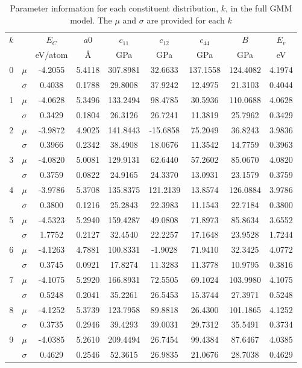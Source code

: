 \begin{table}[ht]
	\centering
	\caption{Parameter information for each constituent distribution, $k$, in the full GMM model.  The $\mu$ and $\sigma$ are provided for each $k$}
  \label{tbl:sw_all_gmm_qois}
  \begin{tabular}{ccccccccc}
    \hline
    $k$ & & $E_C$ & $a0$ & $c_{11}$ & $c_{12}$ & $c_{44}$ & $B$ & $E_v$\\
        & & eV/atom & \AA & GPa & GPa & GPa & GPa & eV \\
    \hline
    0 & $\mu$     & -4.2055 & 5.4118 & 307.8981 & 32.6633 & 137.1558 & 124.4082 & 4.1974\\
     & $\sigma$   & 0.4038 & 0.1788 & 29.8008 & 37.9242 & 12.4975 & 21.3103 & 0.4044\\
    1 & $\mu$     & -4.0628 & 5.3496 & 133.2494 & 98.4785 & 30.5936 & 110.0688 & 4.0628\\
     & $\sigma$   & 0.3429 & 0.1804 & 26.3126 & 26.7241 & 11.3819 & 25.7962 & 0.3429\\
    2 & $\mu$     & -3.9872 & 4.9025 & 141.8443 & -15.6858 & 75.2049 & 36.8243 & 3.9836\\
     & $\sigma$   & 0.3966 & 0.2342 & 38.4908 & 18.0676 & 11.3542 & 14.7759 & 0.3963\\
    3 & $\mu$     & -4.0820 & 5.0081 & 129.9131 & 62.6440 & 57.2602 & 85.0670 & 4.0820\\
     & $\sigma$   & 0.3759 & 0.0822 & 24.9165 & 24.3370 & 13.0931 & 23.1579 & 0.3759\\
    4 & $\mu$     & -3.9786 & 5.3708 & 135.8375 & 121.2139 & 13.8574 & 126.0884 & 3.9786\\
     & $\sigma$   & 0.3800 & 0.1216 & 25.2843 & 22.3983 & 11.1543 & 22.7184 & 0.3800\\
    5 & $\mu$     & -4.5323 & 5.2940 & 159.4287 & 49.0808 & 71.8973 & 85.8634 & 3.6552\\
     & $\sigma$   & 1.7752 & 0.2127 & 32.4540 & 22.2257 & 17.1648 & 23.9528 & 1.7244\\
    6 & $\mu$     & -4.1263 & 4.7881 & 100.8331 & -1.9028 & 71.9410 & 32.3425 & 4.0772\\
     & $\sigma$   & 0.3745 & 0.0921 & 17.8274 & 11.3283 & 11.3778 & 10.9795 & 0.3816\\
    7 & $\mu$     & -4.1075 & 5.2920 & 166.8931 & 72.5505 & 69.1024 & 103.9980 & 4.1075\\
     & $\sigma$   & 0.5248 & 0.2041 & 35.2261 & 26.5453 & 15.3744 & 27.3971 & 0.5248\\
    8 & $\mu$     & -4.1252 & 5.3739 & 123.7958 & 89.8818 & 26.4300 & 101.1865 & 4.1252\\
     & $\sigma$   & 0.3735 & 0.2946 & 39.4293 & 39.0031 & 29.7312 & 35.5491 & 0.3734\\
    9 & $\mu$     & -4.0385 & 5.2610 & 209.4494 & 26.7454 & 99.4384 & 87.6467 & 4.0385\\
     & $\sigma$   & 0.4629 & 0.2546 & 52.3615 & 26.9835 & 21.0676 & 28.7038 & 0.4629\\
    \hline
  \end{tabular}
\end{table}

